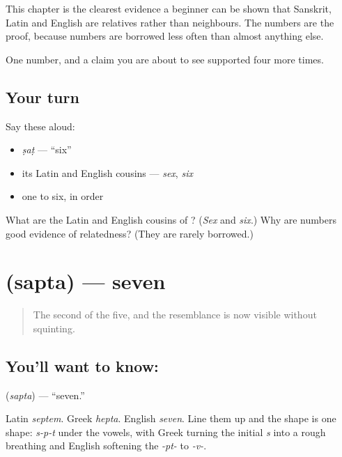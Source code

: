 This chapter is the clearest evidence a beginner can be shown that Sanskrit, Latin and English are relatives rather than neighbours. The numbers are the proof, because numbers are borrowed less often than almost anything else.

\begin{grammarlens}[title={What you've built}]
One number, and a claim you are about to see supported four more times.
\end{grammarlens}

\subsection*{Your turn}
Say these aloud:

\begin{itemize}
\raggedright
  \item \emph{ṣaṭ} — \textquotedblleft{}six\textquotedblright{}
  \item its Latin and English cousins — \emph{sex}, \emph{six}
  \item one to six, in order
\end{itemize}

\begin{tcolorbox}[breakable,colback=teal!4,colframe=teal!35!black,title={Before you move on}]
What are the Latin and English cousins of ? (\emph{Sex} and \emph{six}.) Why are numbers good evidence of relatedness? (They are rarely borrowed.)
\end{tcolorbox}
\section[\texorpdfstring{\sk{सप्त} (sapta)}{सप्त (sapta)}]{ (sapta) — seven}

\label{lesson:SA-C19-seven}



\begin{quote}
The second of the five, and the resemblance is now visible without squinting.
\end{quote}

\subsection*{You'll want to know: }
\textbf{} (\emph{sapta}) — \textquotedblleft{}seven.\textquotedblright{}

Latin \emph{septem}. Greek \emph{hepta}. English \emph{seven}. Line them up and the shape is one shape: \emph{s-p-t} under the vowels, with Greek turning the initial \emph{s} into a rough breathing and English softening the \emph{-pt-} to \emph{-v-}.

